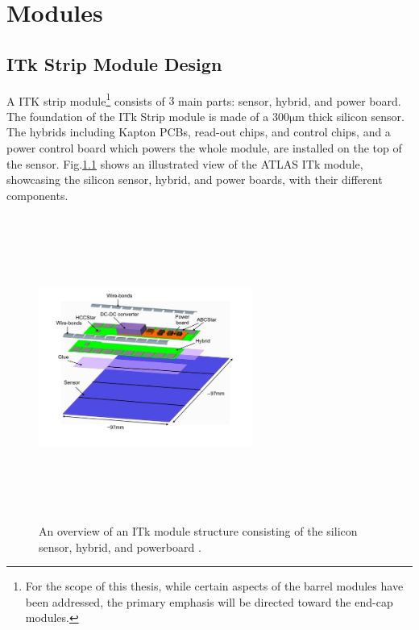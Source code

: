 
\chapter{Modules} %

\label{Modules} %


\newcommand{\keyword}[1]{\textbf{#1}}
\newcommand{\tabhead}[1]{\textbf{#1}}
\newcommand{\code}[1]{\texttt{#1}}
\newcommand{\file}[1]{\texttt{\bfseries#1}}
\newcommand{\option}[1]{\texttt{\itshape#1}}

\section{ITk Strip Module Design }
A ITK strip module\protect\footnote{For the scope of this thesis, while certain aspects of the barrel modules have been addressed, the primary emphasis will be directed toward the end-cap modules.} consists of $3$ main parts: sensor, hybrid, and power board.
The foundation of the ITk Strip module is made of a $300 \si{\micro\meter}$ thick silicon sensor. The hybrids including Kapton PCBs, read-out chips, and control chips, and a power control board which powers the whole module, are installed on the top of the sensor. Fig.\ref{fig:modulelayout} shows an illustrated view of the ATLAS ITk module, showcasing the silicon sensor, hybrid, and power boards, with their different components.\\

\begin{figure}
    \centering
    \includegraphics[width=7cm,height=10cm,keepaspectratio]{Figures/modules/modulelayout.jpg}
    \caption{An overview of an ITk module structure consisting of the silicon sensor, hybrid, and powerboard \cite{Collaboration:390920}.}
    \label{fig:modulelayout}
\end{figure}

